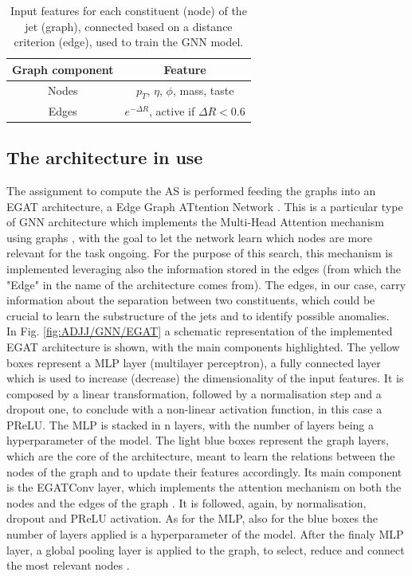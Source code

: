 \begin{table}[htbp]
\centering
\begin{tabular}{|c|c|}
\hline
\rowcolor{lightgray}
\textbf{Graph component}  & \textbf{Feature}\\
\hline\hline
Nodes & $p_T$, $\eta$, $\phi$, mass, taste   \\
\hline
Edges & $e^{-\Delta R}$, active if $\Delta R < 0.6$  \\
\hline
\end{tabular}
\caption{Input features for each constituent (node) of the jet (graph), connected based on a distance criterion (edge), used to train the GNN model.}
\label{tab:ADJJ/GNN/GNNfeatures}
\end{table}

\subsection{The architecture in use}\label{sec:ADJJ/GNN/architecture}
The assignment to compute the AS is performed feeding the graphs into an EGAT architecture, a Edge Graph ATtention Network \cite{EGAT}.
This is a particular type of GNN architecture which implements the Multi-Head Attention mechanism using graphs \cite{MHA}, with the goal to let the network learn which nodes are more relevant for the task ongoing.
For the purpose of this search, this mechanism is implemented leveraging also the information stored in the edges (from which the "Edge" in the name of the architecture comes from).
The edges, in our case, carry information about the separation between two constituents, which could be crucial to learn the substructure of the jets and to identify possible anomalies.\\
In Fig. \ref{fig:ADJJ/GNN/EGAT} a schematic representation of the implemented EGAT architecture is shown, with the main components highlighted.
The yellow boxes represent a MLP layer (multilayer perceptron), a fully connected layer which is used to increase (decrease) the dimensionality of the input features.
It is composed by a linear transformation, followed by a normalisation step and a dropout one, to conclude with a non-linear activation function, in this case a PReLU.
The MLP is stacked in n layers, with the number of layers being a hyperparameter of the model.
The light blue boxes represent the graph layers, which are the core of the architecture, meant to learn the relations between the nodes of the graph and to update their features accordingly.
Its main component is the EGATConv layer, which implements the attention mechanism on both the nodes and the edges of the graph \cite{EGAT}.
It is followed, again, by normalisation, dropout and PReLU activation.
As for the MLP, also for the blue boxes the number of layers applied is a hyperparameter of the model.
After the finaly MLP layer, a global pooling layer is applied to the graph, to select, reduce and connect the most relevant nodes \cite{GraphPooling}. 

